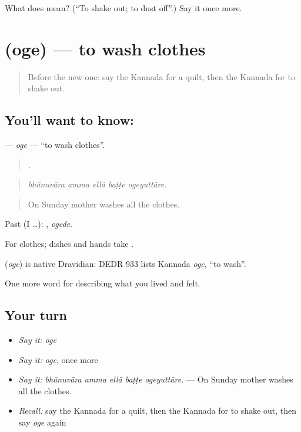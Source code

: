 \begin{tcolorbox}[breakable,colback=teal!4,colframe=teal!35!black,title={Before you move on}]
What does  mean? (\textquotedblleft{}To shake out; to dust off\textquotedblright{}.) Say it once more.
\end{tcolorbox}
\section[\texorpdfstring{\kn{ಒಗೆ} (oge)}{ಒಗೆ (oge)}]{ (oge) — to wash clothes}

\label{lesson:KA-C545-oge}



\begin{quote}
Before the new one: say the Kannada for a quilt, then the Kannada for to shake out.
\end{quote}

\subsection*{You'll want to know: }
\textbf{} — \emph{oge} — \textquotedblleft{}to wash clothes\textquotedblright{}.

\begin{quote}
    .
\end{quote}

\begin{quote}
\emph{bhānuvāra amma ellā baṭṭe ogeyuttāre.}
\end{quote}

\begin{quote}
On Sunday mother washes all the clothes.
\end{quote}

Past (I …): , \emph{ogede}.

For clothes; dishes and hands take .

\begin{cousinweb}
\textbf{} (\emph{oge}) is native Dravidian: DEDR 933 lists Kannada \emph{oge}, \textquotedblleft{}to wash\textquotedblright{}.
\end{cousinweb}

\begin{grammarlens}[title={What you've built}]
One more word for describing what you lived and felt.
\end{grammarlens}

\subsection*{Your turn}
\begin{itemize}
\raggedright
  \item \emph{Say it:} \emph{oge}
  \item \emph{Say it:} \emph{oge}, once more
  \item \emph{Say it:} \emph{bhānuvāra amma ellā baṭṭe ogeyuttāre.} — On Sunday mother washes all the clothes.
  \item \emph{Recall:} say the Kannada for a quilt, then the Kannada for to shake out, then say \emph{oge} again
\end{itemize}

